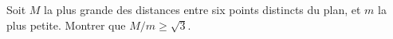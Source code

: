 Soit $M$ la plus grande des distances entre six points distincts du plan, et $m$ la plus petite. Montrer que $M/m \geq \sqrt{3}$.

